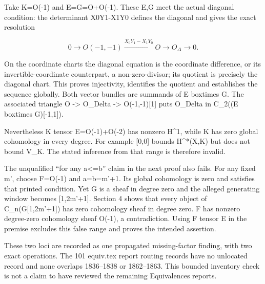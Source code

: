 Take K\allowbreak{}=O(-1)\allowbreak{} and E\allowbreak{}=G\allowbreak{}=O\allowbreak{}+O(-1)\allowbreak{}. These E,\allowbreak{}G meet the actual diagonal condition:\allowbreak{} the determinant X0Y1-X1Y0 defines the diagonal and gives the exact resolution

\[
 0\to O(-1,-1)\xrightarrow{X_0Y_1-X_1Y_0}
 O\to O_\Delta\to0.
\]

On the coordinate charts the diagonal equation is the coordinate difference,\allowbreak{} or its invertible-coordinate counterpart,\allowbreak{} a non-zero-divisor; its quotient is precisely the diagonal chart. This proves injectivity,\allowbreak{} identifies the quotient and establishes the sequence globally. Both vector bundles are summands of E boxtimes G. The associated triangle O \allowbreak{}-> O\_\allowbreak{}Delta \allowbreak{}-> O(-1,\allowbreak{}-1)\allowbreak{}[1]\allowbreak{} puts O\_\allowbreak{}Delta in C\_\allowbreak{}2((E boxtimes G)\allowbreak{}[-1,\allowbreak{}1]\allowbreak{})\allowbreak{}.

Nevertheless K tensor E\allowbreak{}=O(-1)\allowbreak{}\allowbreak{}+O(-2)\allowbreak{} has nonzero H\textasciicircum{}1,\allowbreak{} while K has zero global cohomology in every degree. For example [0,\allowbreak{}0]\allowbreak{} bounds H\textasciicircum{}*(X,\allowbreak{}K)\allowbreak{} but does not bound V\_\allowbreak{}K. The stated inference from that range is therefore invalid.

The unqualified ``for any a<\allowbreak{}=b” claim in the next proof also fails. For any fixed m',\allowbreak{} choose F\allowbreak{}=O(-1)\allowbreak{} and a\allowbreak{}=b\allowbreak{}=m'\allowbreak{}+1. Its global cohomology is zero and satisfies that printed condition. Yet G is a sheaf in degree zero and the alleged generating window becomes [1,\allowbreak{}2m'\allowbreak{}+1]\allowbreak{}. Section 4 shows that every object of C\_\allowbreak{}n(G[1,\allowbreak{}2m'\allowbreak{}+1]\allowbreak{})\allowbreak{} has zero cohomology sheaf in degree zero. F has nonzero degree-zero cohomology sheaf O(-1)\allowbreak{},\allowbreak{} a contradiction. Using F tensor E in the premise excludes this false range and proves the intended assertion.

These two loci are recorded as one propagated missing-factor finding,\allowbreak{} with two exact operations. The 101 equiv.tex report routing records have no unlocated record and none overlaps 1836–\allowbreak{}1838 or 1862–\allowbreak{}1863. This bounded inventory check is not a claim to have reviewed the remaining Equivalences reports.

